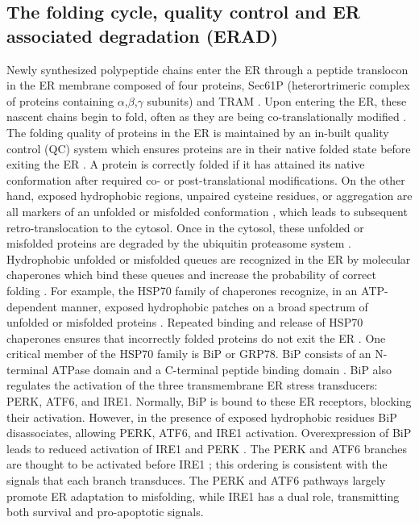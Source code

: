 \documentclass[fleqn,10pt]{wlscirep}
\begin{document}
\subsection*{The folding cycle, quality control and ER associated degradation (ERAD)}
Newly synthesized polypeptide chains enter the ER through a peptide translocon in the ER membrane composed of four proteins, Sec61P (heterortrimeric complex of proteins containing $\alpha$,$\beta$,$\gamma$ subunits) and TRAM \cite{Matlack:1998kx}.
Upon entering the ER, these nascent chains begin to fold, often as they are being co-translationally modified \cite{Fedorov:1997ys}. The folding quality of proteins in the ER is maintained by an in-built quality control (QC) system which ensures proteins are in their native folded state before exiting the ER \cite{ellgaard1999ssq,ellgaard2003qce}. A protein is correctly folded if it has attained its native conformation after required co- or post-translational modifications. On the other hand, exposed hydrophobic regions, unpaired cysteine residues, or aggregation are all markers of an unfolded or misfolded conformation \cite{ellgaard1999ssq}, which leads to subsequent retro-translocation to the cytosol. Once in the cytosol, these unfolded or misfolded proteins are degraded by the ubiquitin proteasome system \cite{Hershko:2000kl}. Hydrophobic unfolded or misfolded queues are recognized in the ER by molecular chaperones which bind these queues and increase the probability of correct folding \cite{fra1993qce,helenius1997cca,hellman1999vab}. For example, the HSP70 family of chaperones recognize, in an ATP-dependent manner, exposed hydrophobic patches on a broad spectrum of unfolded or misfolded proteins \cite{kaufman2002unfolded}. Repeated binding and release of HSP70 chaperones ensures that incorrectly folded proteins do not exit the ER \cite{kaufman2002unfolded}. One critical member of the HSP70 family is BiP or GRP78. BiP consists of an N-terminal ATPase domain and a C-terminal peptide binding domain \cite{GETHING1999}. BiP also regulates the activation of the three transmembrane ER stress transducers: PERK, ATF6, and IRE1. Normally, BiP is bound to these ER receptors, blocking their activation. However, in the presence of exposed hydrophobic residues BiP disassociates, allowing PERK, ATF6, and IRE1 activation. Overexpression of BiP leads to reduced activation of IRE1 and PERK \cite{bertolotti2000dib,kohno1993pry}. The PERK and ATF6 branches are thought to be activated before IRE1 \cite{szegezdi2006mediators}; this ordering is consistent with the signals that each branch transduces. The PERK and ATF6 pathways largely promote ER adaptation to misfolding, while IRE1 has a dual role, transmitting both survival and pro-apoptotic signals.
\end{document}
